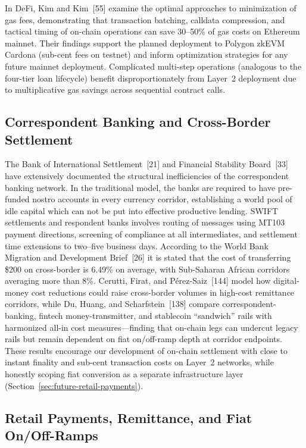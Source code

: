 \documentclass[12pt,a4paper]{report}
\begin{document}
In DeFi, Kim and Kim~[55] examine the optimal approaches to minimization of gas fees, demonstrating that transaction batching, calldata compression, and tactical timing of on-chain operations can save 30--50\% of gas costs on Ethereum mainnet. Their findings support the planned deployment to Polygon zkEVM Cardona (sub-cent fees on testnet) and inform optimization strategies for any future mainnet deployment. Complicated multi-step operations (analogous to the four-tier loan lifecycle) benefit disproportionately from Layer~2 deployment due to multiplicative gas savings across sequential contract calls.

\subsection{Correspondent Banking and Cross-Border Settlement}

The Bank of International Settlement~[21] and Financial Stability Board~[33] have extensively documented the structural inefficiencies of the correspondent banking network. In the traditional model, the banks are required to have pre-funded nostro accounts in every currency corridor, establishing a world pool of idle capital which can not be put into effective productive lending. SWIFT settlements and respondent banks involves routing of messages using MT103 payment directions, screening of compliance at all intermediates, and settlement time extensions to two--five business days. According to the World Bank Migration and Development Brief~[26] it is stated that the cost of transferring \$200 on cross-border is 6.49\% on average, with Sub-Saharan African corridors averaging more than 8\%. Cerutti, Firat, and P\'{e}rez-Saiz~[144] model how digital-money cost reductions could raise cross-border volumes in high-cost remittance corridors, while Du, Huang, and Scharfstein~[138] compare correspondent-banking, fintech money-transmitter, and stablecoin ``sandwich'' rails with harmonized all-in cost measures---finding that on-chain legs can undercut legacy rails but remain dependent on fiat on/off-ramp depth at corridor endpoints. These results encourage our development of on-chain settlement with close to instant finality and sub-cent transaction costs on Layer~2 networks, while honestly scoping fiat conversion as a separate infrastructure layer (Section~\ref{sec:future-retail-payments}).

\subsection{Retail Payments, Remittance, and Fiat On/Off-Ramps}
\label{sec:lit-retail-payments}
\end{document}
